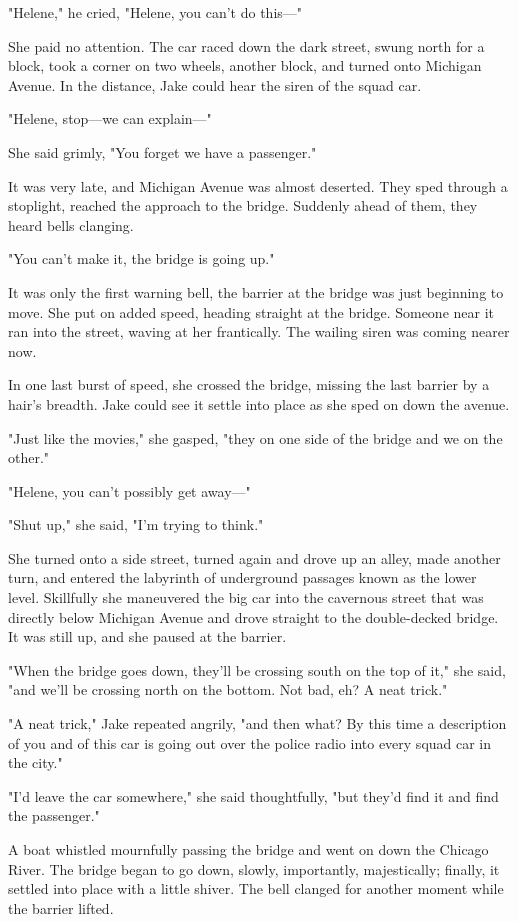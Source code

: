 \documentclass{novel}
\begin{document}
"Helene," he cried, "Helene, you can't do this—"

She paid no attention. The car raced down the dark street, swung north for a block, took a corner on two wheels, another block, and turned onto Michigan Avenue. In the distance, Jake could hear the siren of the squad car.

"Helene, stop—we can explain—"

She said grimly, "You forget we have a passenger."

It was very late, and Michigan Avenue was almost deserted. They sped through a stoplight, reached the approach to the bridge. Suddenly ahead of them, they heard bells clanging.

"You can't make it, the bridge is going up."

It was only the first warning bell, the barrier at the bridge was just beginning to move. She put on added speed, heading straight at the bridge. Someone near it ran into the street, waving at her frantically. The wailing siren was coming nearer now.

In one last burst of speed, she crossed the bridge, missing the last barrier by a hair's breadth. Jake could see it settle into place as she sped on down the avenue.

"Just like the movies," she gasped, "they on one side of the bridge and we on the other."

"Helene, you can't possibly get away—"

"Shut up," she said, "I'm trying to think."

She turned onto a side street, turned again and drove up an alley, made another turn, and entered the labyrinth of underground passages known as the lower level. Skillfully she maneuvered the big car into the cavernous street that was directly below Michigan Avenue and drove straight to the double-decked bridge. It was still up, and she paused at the barrier.

"When the bridge goes down, they'll be crossing south on the top of it," she said, "and we'll be crossing north on the bottom. Not bad, eh? A neat trick."

"A neat trick," Jake repeated angrily, "and then what? By this time a description of you and of this car is going out over the police radio into every squad car in the city."

"I'd leave the car somewhere," she said thoughtfully, "but they'd find it and find the passenger."

A boat whistled mournfully passing the bridge and went on down the Chicago River. The bridge began to go down, slowly, importantly, majestically; finally, it settled into place with a little shiver. The bell clanged for another moment while the barrier lifted.
\end{document}

